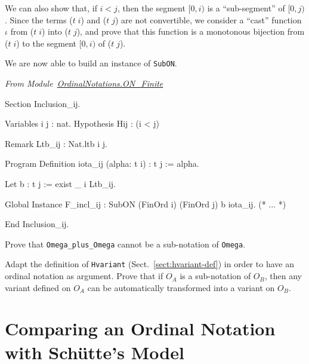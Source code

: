 We can also show that, if $i<j$, then the segment $[0,i)$ is a ``sub-segment'' of
$[0,j)$. Since the terms  ($t\;i$) and ($t\;j$) are not convertible, we consider a ``cast'' 
function $\iota$ from ($t\;i$) into ($t\;j$), and prove that this function is  a monotonous bijection  from ($t\;i$) to
the segment $[0,i)$ of ($t\;j$).




 




We are now able to build an instance of \texttt{SubON}. 

\vspace{4pt}
\noindent\emph{From Module~\href{../theories/html/hydras.OrdinalNotations.ON_Finite.html}{OrdinalNotations.ON\_Finite}}

\begin{Coqsrc}
Section Inclusion_ij.

  Variables i j : nat.
  Hypothesis Hij : (i < j)%

  Remark Ltb_ij : Nat.ltb i j.

  Program Definition iota_ij  (alpha: t i) : t j :=  alpha.
 
   Let b : t j := exist _ i Ltb_ij.
   
   Global Instance F_incl_ij  : SubON  (FinOrd i) (FinOrd j) b iota_ij.
  (* ... *)

  End Inclusion_ij.
\end{Coqsrc}
         


\begin{exercise}
Prove that \texttt{Omega\_plus\_Omega} cannot be a sub-notation of \texttt{Omega}.
\end{exercise}

\begin{project}
Adapt the definition of \texttt{Hvariant} (Sect.~\ref{sect:hvariant-def}) in order to
have an ordinal notation as argument. Prove that if $O_A$ is a sub-notation of $O_B$, then any variant defined on  $O_A$ can be automatically transformed into 
a variant on $O_B$.
\end{project}




\section{Comparing an Ordinal Notation with Schütte's Model}

